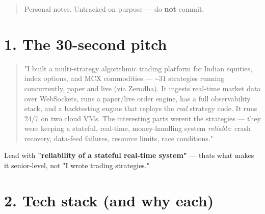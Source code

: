 \documentclass[11pt]{article}
\begin{document}
\makecoverpage

\thispagestyle{empty}
{\hypersetup{hidelinks}\tableofcontents}
\clearpage

\begin{quote}
Personal notes. Untracked on purpose --- do \textbf{not} commit.
\end{quote}

\section{1. The 30-second pitch}\label{1-the-30-second-pitch}

\begin{quote}
"I built a multi-strategy algorithmic trading platform for Indian equities, index
options, and MCX commodities --- \textasciitilde31 strategies running concurrently, paper and live
(via Zerodha). It ingests real-time market data over WebSockets, runs a paper/live
order engine, has a full observability stack, and a backtesting engine that replays
the \emph{real} strategy code. It runs 24/7 on two cloud VMs. The interesting parts
weren\textquotesingle t the strategies --- they were keeping a stateful, real-time, money-handling
system \emph{reliable}: crash recovery, data-feed failures, resource limits, race conditions."
\end{quote}

Lead with \textbf{"reliability of a stateful real-time system"} --- that\textquotesingle s what makes it
senior-level, not "I wrote trading strategies."

\section{2. Tech stack (and why each)}\label{2-tech-stack-and-why-each}
\end{document}
